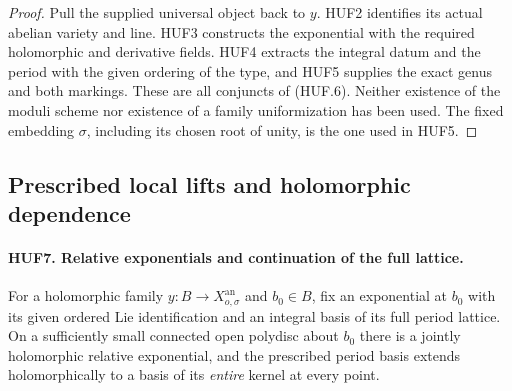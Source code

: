\begin{proof}
Pull the supplied universal object back to \(y\).
HUF2 identifies its actual abelian variety and line.
HUF3 constructs the exponential with the required
holomorphic and derivative fields.
HUF4 extracts the integral datum and the period with the
given ordering of the type, and HUF5 supplies the exact
genus and both markings.  These are all conjuncts of
(HUF.6).  Neither existence of the moduli scheme nor
existence of a family uniformization has been used.
The fixed embedding \(\sigma\), including its chosen
root of unity, is the one used in HUF5.
\end{proof}

\subsection{Prescribed local lifts and holomorphic dependence}

\paragraph{HUF7. Relative exponentials and continuation of the full lattice.}
\label{claim:HUF7}
For a holomorphic family \(y:B\to X_{o,\sigma}^{\mathrm{an}}\)
and \(b_0\in B\), fix an exponential at \(b_0\) with its
given ordered Lie identification and an integral basis
of its full period lattice.  On a sufficiently small
connected open polydisc about \(b_0\) there is a jointly
holomorphic relative exponential, and the prescribed
period basis extends holomorphically to a basis of its
\emph{entire} kernel at every point.

